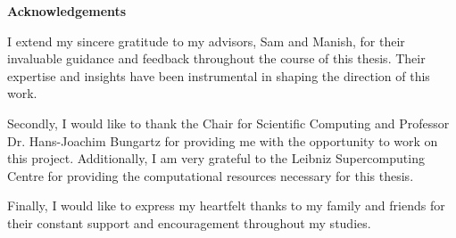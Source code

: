 {}
\vspace*{2cm}
\begin{center}
    {\Large \textbf{Acknowledgements}}
\end{center}
\vspace{1cm}

I extend my sincere gratitude to my advisors, Sam and Manish, for their invaluable guidance and feedback throughout the course of this thesis. Their expertise and insights have been instrumental in shaping the direction of this work.

Secondly, I would like to thank the Chair for Scientific Computing and Professor Dr. Hans-Joachim Bungartz for providing me with the opportunity to work on this project. Additionally, I am very grateful to the Leibniz Supercomputing Centre for providing the computational resources necessary for this thesis.

Finally, I would like to express my heartfelt thanks to my family and friends for their constant support and encouragement throughout my studies.